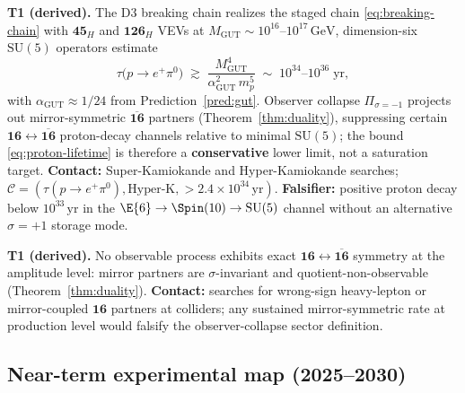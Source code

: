 \begin{prediction}\label{pred:proton-decay}
\textbf{T1 (derived).} The D3 breaking chain realizes the staged chain
\eqref{eq:breaking-chain} with $\mathbf{45}_H$ and $\mathbf{126}_H$ VEVs at
$M_{\mathrm{GUT}}\sim 10^{16}$--$10^{17}\,\mathrm{GeV}$, dimension-six
$\mathrm{SU}(5)$ operators estimate
\begin{equation}\label{eq:proton-lifetime}
  \tau\!\bigl(p\to e^+\pi^0\bigr)
  \;\gtrsim\;
  \frac{M_{\mathrm{GUT}}^{4}}{\alpha_{\mathrm{GUT}}^{2}\,m_{p}^{5}}
  \;\sim\;
  10^{34}\text{--}10^{36}\;\mathrm{yr},
\end{equation}
with $\alpha_{\mathrm{GUT}}\approx 1/24$ from Prediction~\ref{pred:gut}.
Observer collapse $\Pi_{\sigma=-1}$ projects out mirror-symmetric
$\overline{\mathbf{16}}$ partners (Theorem~\ref{thm:duality}), suppressing
certain $\mathbf{16}\leftrightarrow\overline{\mathbf{16}}$ proton-decay
channels relative to minimal $\mathrm{SU}(5)$; the bound \eqref{eq:proton-lifetime}
is therefore a \textbf{conservative} lower limit, not a saturation target.
\textbf{Contact:} Super-Kamiokande and Hyper-Kamiokande searches;
$\mathcal{C}=(\tau(p\to e^+\pi^0),\mathrm{Hyper\text{-}K},>\!2.4\times 10^{34}\,\mathrm{yr})$.
\textbf{Falsifier:} positive proton decay below $10^{33}\,\mathrm{yr}$ in the
$\E{6}\to\Spin(10)\to\mathrm{SU}(5)$ channel without an alternative
$\sigma=+1$ storage mode.
\end{prediction}

\begin{prediction}\label{pred:mirror-null}
\textbf{T1 (derived).} No observable process exhibits exact $\mathbf{16}\leftrightarrow
\overline{\mathbf{16}}$ symmetry at the amplitude level: mirror partners are
$\sigma$-invariant and quotient-non-observable (Theorem~\ref{thm:duality}).
\textbf{Contact:} searches for wrong-sign heavy-lepton or mirror-coupled
$\mathbf{16}$ partners at colliders; any sustained mirror-symmetric rate at
production level would falsify the observer-collapse sector definition.
\end{prediction}

\subsection{Near-term experimental map (2025--2030)}
\label{sec:predictions:experiments}

